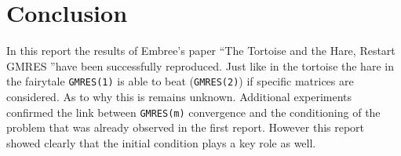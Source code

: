 \section{Conclusion}
In this report the results of Embree's paper \textquotedblleft The Tortoise and the Hare, Restart GMRES \textquotedblright have been successfully reproduced. Just like in the tortoise the hare in the fairytale \texttt{GMRES(1)} is able to beat (\texttt{GMRES(2)}) if specific matrices are considered. As to why this is remains unknown. Additional experiments confirmed the link between \texttt{GMRES(m)} convergence and the conditioning of the problem that was already observed in the first report. However this report showed clearly that the initial condition plays a key role as well.